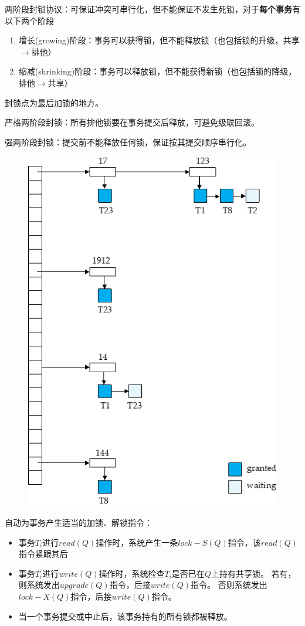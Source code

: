 两阶段封锁协议：可保证冲突可串行化，但不能保证不发生死锁，对于\textbf{每个事务}有以下两个阶段
\begin{enumerate}
	\item 增长(growing)阶段：事务可以获得锁，但不能释放锁（也包括锁的升级，共享$\to$排他）
	\item 缩减(shrinking)阶段：事务可以释放锁，但不能获得新锁（也包括锁的降级，排他$\to$共享）
\end{enumerate}
封锁点为最后加锁的地方。

严格两阶段封锁：所有排他锁要在事务提交后释放，可避免级联回滚。

强两阶段封锁：提交前不能释放任何锁，保证按其提交顺序串行化。

\begin{figure}[H]
\centering
\includegraphics[width=0.4\linewidth]{fig/lock_table.png}
\end{figure}

自动为事务产生适当的加锁、解锁指令：
\begin{itemize}
	\item 事务$T_i$进行$read(Q)$操作时，系统产生一条$lock-S(Q)$指令，该$read(Q)$指令紧跟其后
	\item 事务$T_i$进行$write(Q)$操作时，系统检查$T_i$是否已在$Q$上持有共享锁。
	若有，则系统发出$upgrade(Q)$指令，后接$write(Q)$指令。
	否则系统发出$lock-X(Q)$指令，后接$write(Q)$指令。
	\item 当一个事务提交或中止后，该事务持有的所有锁都被释放。
\end{itemize}

